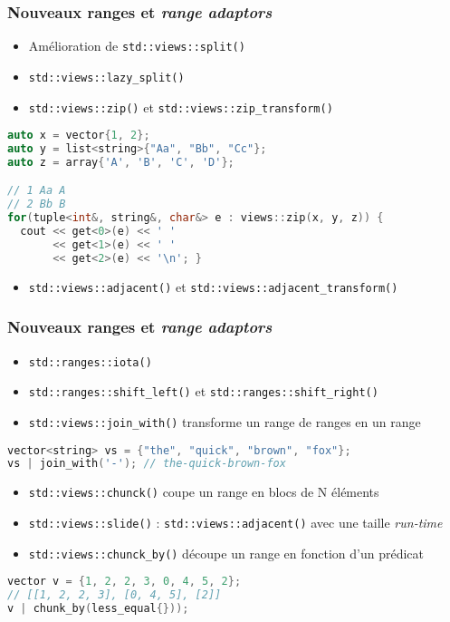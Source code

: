 \documentclass[C++.tex]{subfiles}
\begin{document}
\begin{frame}[fragile]
	\frametitle{Nouveaux ranges et \textit{range adaptors}}
	\begin{itemize}
		\item Amélioration de \lstinline|std::views::split()|
		\item \lstinline|std::views::lazy_split()|
		\item \lstinline|std::views::zip()| et \lstinline|std::views::zip_transform()|
	\end{itemize}

\begin{lstlisting}[language=C++]
auto x = vector{1, 2};
auto y = list<string>{"Aa", "Bb", "Cc"};
auto z = array{'A', 'B', 'C', 'D'};

// 1 Aa A
// 2 Bb B
for(tuple<int&, string&, char&> e : views::zip(x, y, z)) {
  cout << get<0>(e) << ' ' 
       << get<1>(e) << ' '
       << get<2>(e) << '\n'; }\end{lstlisting}

	\begin{itemize}
		\item \lstinline|std::views::adjacent()| et \lstinline|std::views::adjacent_transform()|
	\end{itemize}
\end{frame}

\begin{frame}[fragile]
	\frametitle{Nouveaux ranges et \textit{range adaptors}}
	\begin{itemize}
		\item \lstinline|std::ranges::iota()|
		\item \lstinline|std::ranges::shift_left()| et \lstinline|std::ranges::shift_right()|


		\item \lstinline|std::views::join_with()| transforme un range de ranges en un range
	\end{itemize}

	\begin{lstlisting}[language=C++]
vector<string> vs = {"the", "quick", "brown", "fox"};
vs | join_with('-'); // the-quick-brown-fox\end{lstlisting}

	\begin{itemize}
		\item \lstinline|std::views::chunck()| coupe un range en blocs de N éléments
		\item \lstinline|std::views::slide()| : \lstinline|std::views::adjacent()| avec une taille  \textit{run-time}
		\item \lstinline|std::views::chunck_by()| découpe un range en fonction d'un prédicat
	\end{itemize}

	\begin{lstlisting}[language=C++]
vector v = {1, 2, 2, 3, 0, 4, 5, 2};
// [[1, 2, 2, 3], [0, 4, 5], [2]]
v | chunk_by(less_equal{}));\end{lstlisting}
\end{frame}
\end{document}
